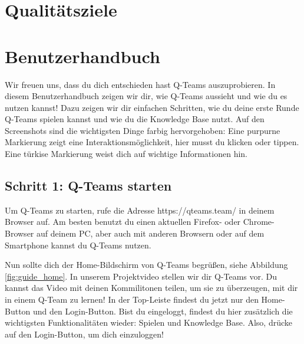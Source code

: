 \documentclass[a4paper,11pt,listof=numbered,glossary=totoc,parskip=half,toc=bib]{scrreprt}
\begin{document}
\begin{appendices}
		
			
		
		
		
	
	\chapter{Qualitätsziele}
	\chapter{Benutzerhandbuch}

	Wir freuen uns, dass du dich entschieden hast Q-Teams auszuprobieren. In diesem Benutzerhandbuch zeigen wir dir, wie Q-Teams aussieht und wie du es nutzen kannst! Dazu zeigen wir dir einfachen Schritten, wie du deine erste Runde Q-Teams spielen kannst und wie du die Knowledge Base nutzt. Auf den Screenshots sind die wichtigsten Dinge farbig hervorgehoben: Eine purpurne Markierung zeigt eine Interaktionsmöglichkeit, hier musst du klicken oder tippen. Eine türkise Markierung weist dich auf wichtige Informationen hin.
	\newpage
	\section*{Schritt 1: Q-Teams starten}
	
	Um Q-Teams zu starten, rufe die Adresse https://qteams.team/ in deinem Browser auf. Am besten benutzt du einen aktuellen Firefox- oder Chrome-Browser auf deinem PC, aber auch mit anderen Browsern oder auf dem Smartphone kannst du Q-Teams nutzen.
	
	Nun sollte dich der Home-Bildschirm von Q-Teams begrüßen, siehe Abbildung \ref{fig:guide_home}. In unserem Projektvideo stellen wir dir Q-Teams vor. Du kannst das Video mit deinen Kommilitonen teilen, um sie zu überzeugen, mit dir in einem Q-Team zu lernen! In der Top-Leiste findest du jetzt nur den Home-Button und den Login-Button. Bist du eingeloggt, findest du hier zusätzlich die wichtigsten Funktionalitäten wieder: Spielen und Knowledge Base. Also, drücke auf den Login-Button, um dich einzuloggen!
	

\end{appendices}
\end{document}
